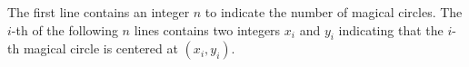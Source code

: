 The first line contains an integer $n$ to indicate the number of 
magical circles.
The $i$-th of the following $n$ lines contains two integers $x_i$ and $y_i$
indicating that the $i$-th magical circle is centered at $(x_i,y_i)$.
